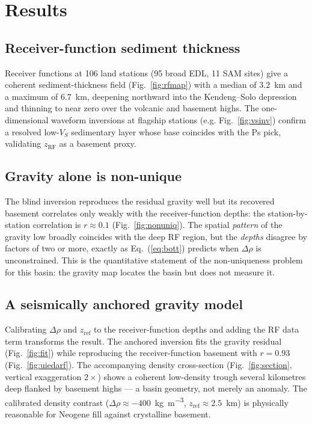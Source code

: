 \section{Results}

\subsection{Receiver-function sediment thickness}
Receiver functions at 106 land stations (95 broad EDL, 11 SAM sites) give a
coherent sediment-thickness field (Fig.~\ref{fig:rfmap}) with a median of
$3.2$~km and a maximum of $6.7$~km, deepening northward into the Kendeng--Solo
depression and thinning to near zero over the volcanic and basement highs. The
one-dimensional waveform inversions at flagship stations (e.g.
Fig.~\ref{fig:vsinv}) confirm a resolved low-$V_S$ sedimentary layer whose base
coincides with the Ps pick, validating $z_{\mathrm{RF}}$ as a basement proxy.

\subsection{Gravity alone is non-unique}
The blind inversion reproduces the residual gravity well but its recovered
basement correlates only weakly with the receiver-function depths: the
station-by-station correlation is $r\approx0.1$ (Fig.~\ref{fig:nonuniq}). The
spatial \emph{pattern} of the gravity low broadly coincides with the deep RF
region, but the \emph{depths} disagree by factors of two or more, exactly as
Eq.~(\ref{eq:bott}) predicts when $\Delta\rho$ is unconstrained. This is the
quantitative statement of the non-uniqueness problem for this basin: the gravity
map locates the basin but does not measure it.

\subsection{A seismically anchored gravity model}
Calibrating $\Delta\rho$ and $z_{\mathrm{ref}}$ to the receiver-function depths
and adding the RF data term transforms the result. The anchored inversion fits the
gravity residual (Fig.~\ref{fig:fit}) while reproducing the receiver-function
basement with $r=0.93$ (Fig.~\ref{fig:uiedarf}). The accompanying density
cross-section (Fig.~\ref{fig:section}, vertical exaggeration $2\times$) shows a
coherent low-density trough several kilometres deep flanked by basement highs ---
a basin geometry, not merely an anomaly. The calibrated density contrast
($\Delta\rho\approx-400$~\si{\kg\per\m\cubed}, $z_{\mathrm{ref}}\approx2.5$~km)
is physically reasonable for Neogene fill against crystalline basement.

